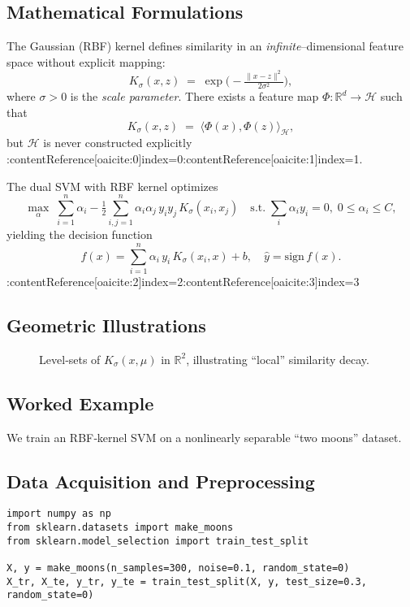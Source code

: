 \documentclass[11pt]{article}
\begin{document}
\subsection{Mathematical Formulations}
The Gaussian (RBF) kernel defines similarity in an \emph{infinite}–dimensional feature space without explicit mapping:
\[
K_\sigma(x,z) \;=\;\exp\!\bigl(-\tfrac{\|x-z\|^2}{2\sigma^2}\bigr),
\]
where $\sigma>0$ is the \emph{scale parameter}.  There exists a feature map $\Phi: \mathbb{R}^d\to\mathcal{H}$ such that
\[
K_\sigma(x,z) \;=\;\langle \Phi(x),\Phi(z)\rangle_{\mathcal{H}},
\]
but $\mathcal{H}$ is never constructed explicitly :contentReference[oaicite:0]{index=0}:contentReference[oaicite:1]{index=1}.

The dual SVM with RBF kernel optimizes
\[
\max_{\alpha}\;\sum_{i=1}^n \alpha_i
-\tfrac{1}{2}\sum_{i,j=1}^n\alpha_i\alpha_j\,y_i y_j\,K_\sigma(x_i,x_j)
\quad\text{s.t.}\;\sum_i \alpha_i y_i=0,\;0\le \alpha_i\le C,
\]
yielding the decision function
\[
f(x)=\sum_{i=1}^n \alpha_i\,y_i\,K_\sigma(x_i,x) + b,\quad
\hat y=\mathrm{sign}\,f(x).
\] :contentReference[oaicite:2]{index=2}:contentReference[oaicite:3]{index=3}

\subsection{Geometric Illustrations}
\begin{figure}[h]
  \centering
  \caption{Level‐sets of $K_\sigma(x,\mu)$ in $\mathbb{R}^2$, illustrating “local” similarity decay.}
\end{figure}

\subsection{Worked Example}
We train an RBF‐kernel SVM on a nonlinearly separable “two moons” dataset.

\subsection{Data Acquisition and Preprocessing}
\begin{lstlisting}
import numpy as np
from sklearn.datasets import make_moons
from sklearn.model_selection import train_test_split

X, y = make_moons(n_samples=300, noise=0.1, random_state=0)
X_tr, X_te, y_tr, y_te = train_test_split(X, y, test_size=0.3, random_state=0)
\end{lstlisting}
\end{document}
